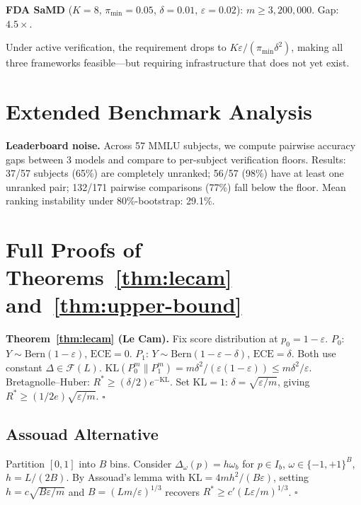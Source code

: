 \documentclass{article}
\newcommand{\ECE}{\mathrm{ECE}}
\newcommand{\cF}{\mathcal{F}}
\newcommand{\Lip}{L}
\newcommand{\errrate}{\varepsilon}
\newcommand{\nsamples}{m}
\newcommand{\calmap}{\Delta}
\providecommand{\KL}{}
\renewcommand{\KL}{\mathrm{KL}}
\newcommand{\Bern}{\mathrm{Bern}}
\newcommand{\groupprop}{\pi}
\newcommand{\targetacc}{\delta}
\theoremstyle{definition}
\begin{document}
\textbf{FDA SaMD} ($K{=}8$, $\groupprop_{\min}{=}0.05$, $\targetacc{=}0.01$, $\errrate{=}0.02$): $\nsamples \geq 3{,}200{,}000$. Gap: $4.5\times$.

Under active verification, the requirement drops to $K\errrate/(\groupprop_{\min}\targetacc^2)$, making all three frameworks feasible---but requiring infrastructure that does not yet exist.

\section{Extended Benchmark Analysis}
\label{app:demolition-extended}

\textbf{Leaderboard noise.} Across 57 MMLU subjects, we compute pairwise accuracy gaps between 3 models and compare to per-subject verification floors. Results: 37/57 subjects (65\%) are completely unranked; 56/57 (98\%) have at least one unranked pair; 132/171 pairwise comparisons (77\%) fall below the floor. Mean ranking instability under 80\%-bootstrap: 29.1\%.



\section{Full Proofs of Theorems~\ref{thm:lecam} and~\ref{thm:upper-bound}}
\label{app:lecam-proof}

\textbf{Theorem~\ref{thm:lecam} (Le Cam).}
Fix score distribution at $p_0 = 1-\errrate$. $P_0$: $Y \sim \Bern(1-\errrate)$, $\ECE = 0$. $P_1$: $Y \sim \Bern(1-\errrate-\targetacc)$, $\ECE = \targetacc$. Both use constant $\calmap \in \cF(\Lip)$.
$\KL(P_0^\nsamples \| P_1^\nsamples) = \nsamples\targetacc^2/(\errrate(1-\errrate)) \leq \nsamples\targetacc^2/\errrate$.
Bretagnolle--Huber: $R^* \geq (\targetacc/2)e^{-\KL}$. Set $\KL = 1$: $\targetacc = \sqrt{\errrate/\nsamples}$, giving $R^* \geq (1/2e)\sqrt{\errrate/\nsamples}$. $\square$

\subsection{Assouad Alternative}
\label{app:assouad}

Partition $[0,1]$ into $B$ bins. Consider $\calmap_\omega(p) = h\omega_b$ for $p \in I_b$, $\omega \in \{-1,+1\}^B$, $h = \Lip/(2B)$. By Assouad's lemma with $\KL = 4\nsamples h^2/(B\errrate)$, setting $h = c\sqrt{B\errrate/\nsamples}$ and $B = (\Lip\nsamples/\errrate)^{1/3}$ recovers $R^* \geq c'(\Lip\errrate/\nsamples)^{1/3}$. $\square$
\end{document}
